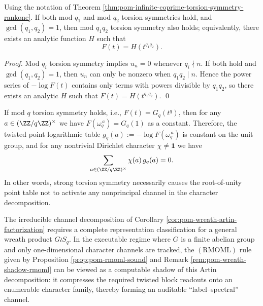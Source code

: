 \begin{corollary}[Coprime multiplicative closure of finite torsion symmetry: two coprime symmetries simultaneously \texorpdfstring{$\Rightarrow$}{=>} product symmetry]\label{cor:pom-torsion-symmetry-coprime-closure}
Using the notation of Theorem \ref{thm:pom-infinite-coprime-torsion-symmetry-rankone}.
If both mod \(q_1\) and mod \(q_2\) torsion symmetries hold, and \(\gcd(q_1,q_2)=1\), then mod \(q_1q_2\) torsion symmetry also holds;
equivalently, there exists an analytic function \(H\) such that
\[
F(t)=H\!\left(t^{q_1q_2}\right).
\]
\end{corollary}
\begin{proof}
Mod \(q_i\) torsion symmetry implies \(u_n=0\) whenever \(q_i\nmid n\).
If both hold and \(\gcd(q_1,q_2)=1\), then \(u_n\) can only be nonzero when \(q_1q_2\mid n\).
Hence the power series of \(-\log F(t)\) contains only terms with powers divisible by \(q_1q_2\), so there exists an analytic \(H\) such that \(F(t)=H(t^{q_1q_2})\).
\qed
\end{proof}

\begin{remark}[Observable necessity condition on the character side: torsion symmetry \texorpdfstring{$\Rightarrow$}{=>} all nonprincipal character coefficients vanish]\label{rem:pom-torsion-symmetry-implies-no-nonprincipal-character}
If mod \(q\) torsion symmetry holds, i.e., \(F(t)=G_q(t^q)\), then for any \(a\in(\ZZ/q\ZZ)^\times\) we have
\(
F(\omega_q^{\,a})=G_q(1)
\)
as a constant.
Therefore, the twisted point logarithmic table \(g_q(a):=-\log F(\omega_q^{\,a})\) is constant on the unit group, and for any nontrivial Dirichlet character \(\chi\neq\mathbf 1\) we have
\[
\sum_{a\in(\ZZ/q\ZZ)^\times}\chi(a)\,g_q(a)=0.
\]
In other words, strong torsion symmetry necessarily causes the root-of-unity point table not to activate any nonprincipal channel in the character decomposition.
\end{remark}

\begin{remark}\label{rem:pom-wreath-artin-computable-shadow}
The irreducible channel decomposition of Corollary \ref{cor:pom-wreath-artin-factorization} requires a complete representation classification for a general wreath product \(G\wr S_q\).
In the executable regime where \(G\) is a finite abelian group and only one-dimensional character channels are tracked,
the \((\mathrm{RMOML})\) rule given by Proposition \ref{prop:pom-rmoml-sound} and Remark \ref{rem:pom-wreath-shadow-rmoml} can be viewed as a computable shadow of this Artin decomposition:
it compresses the required twisted block readouts onto an enumerable character family, thereby forming an auditable ``label--spectral'' channel.
\end{remark}

